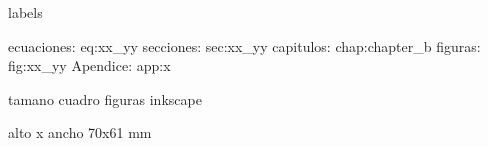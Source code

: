 labels

ecuaciones: eq:xx_yy
secciones: sec:xx_yy
capitulos: chap:chapter_b
figuras: fig:xx_yy
Apendice: app:x


tamano cuadro figuras inkscape

alto x ancho
70x61 mm
